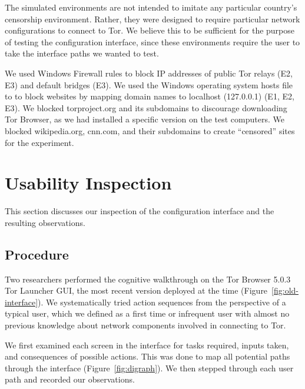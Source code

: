 \documentclass[USenglish,oneside,twocolumn]{article}
\begin{document}
The simulated environments are not intended to imitate any particular country's censorship environment. Rather, they were designed to require particular network configurations
to connect to Tor. We believe this to be sufficient for the purpose of testing the configuration interface, since these environments require the user to take the interface paths we wanted to test. 

We used Windows Firewall rules to block IP addresses of public Tor relays (E2, E3) and default bridges (E3). 
We used the Windows operating system hosts file to to block websites by
mapping domain names to localhost (127.0.0.1) (E1, E2, E3). We blocked torproject.org and its subdomains to discourage downloading Tor Browser, as we had installed a specific version on the test computers.  We blocked wikipedia.org, cnn.com, and their subdomains to create ``censored'' sites for the experiment. 

\section{Usability Inspection}
\label{sec:inspection}
This section discusses our inspection of the configuration interface and the resulting observations.

\subsection{Procedure} 
Two researchers performed the cognitive walkthrough on the Tor Browser 5.0.3 Tor Launcher GUI, the most recent version deployed at the time (Figure~\ref{fig:old-interface}). We systematically tried action sequences from the perspective of a typical user, which we defined as a first time or infrequent user with almost no previous knowledge about network components involved in connecting to Tor.

We first examined each screen in the interface for tasks required, inputs taken, and consequences of possible actions. This was done to map all potential paths through the interface (Figure~\ref{fig:digraph}). We then stepped through each user path and recorded our observations. 
\end{document}
